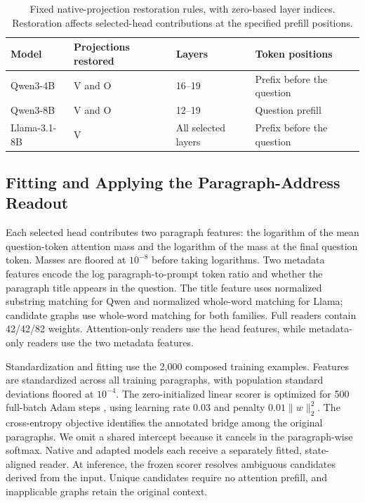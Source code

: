 \begin{table}[!htbp]
  \centering
  \caption{Fixed native-projection restoration rules, with zero-based layer indices. Restoration affects selected-head contributions at the specified prefill positions.}
  \label{tab:scopes}
  \small
  \setlength{\tabcolsep}{6pt}
  \begin{tabular}{llll}
    \toprule
    \textbf{Model} & \textbf{Projections restored} & \textbf{Layers} & \textbf{Token positions} \\
    \midrule
    Qwen3-4B & V and O & 16--19 & Prefix before the question \\
    Qwen3-8B & V and O & 12--19 & Question prefill \\
    Llama-3.1-8B & V & All selected layers & Prefix before the question \\
    \bottomrule
  \end{tabular}
\end{table}

\subsection{Fitting and Applying the Paragraph-Address Readout}
\label{app:readout_protocol}

Each selected head contributes two paragraph features: the logarithm of the mean question-token attention mass and the logarithm of the mass at the final question token. Masses are floored at $10^{-8}$ before taking logarithms. Two metadata features encode the log paragraph-to-prompt token ratio and whether the paragraph title appears in the question. The title feature uses normalized substring matching for Qwen and normalized whole-word matching for Llama; candidate graphs use whole-word matching for both families. Full readers contain 42/42/82 weights. Attention-only readers use the head features, while metadata-only readers use the two metadata features.

Standardization and fitting use the 2,000 composed training examples. Features are standardized across all training paragraphs, with population standard deviations floored at $10^{-4}$. The zero-initialized linear scorer is optimized for 500 full-batch Adam steps \citep{kingma2015adam}, using learning rate 0.03 and penalty $0.01\lVert w\rVert_2^2$. The cross-entropy objective identifies the annotated bridge among the original paragraphs. We omit a shared intercept because it cancels in the paragraph-wise softmax. Native and adapted models each receive a separately fitted, state-aligned reader. At inference, the frozen scorer resolves ambiguous candidates derived from the input. Unique candidates require no attention prefill, and inapplicable graphs retain the original context.

